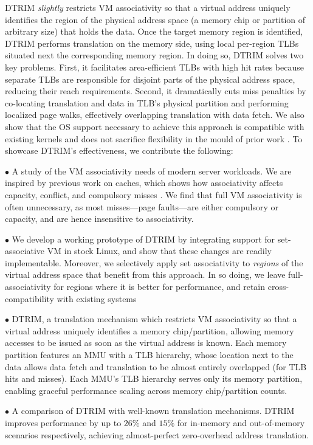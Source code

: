 DTRIM {\it slightly} restricts VM associativity so that a virtual
address uniquely identifies the region of the physical address space
(a memory chip or partition of arbitrary size) that holds the data. Once the target
memory region is identified, DTRIM performs translation on the memory
side, using local per-region TLBs situated next the corresponding
memory region. In doing so, DTRIM solves two key problems. First, it
facilitates area-efficient TLBs with high hit rates because separate
TLBs are responsible for disjoint parts of the physical address space,
reducing their reach requirements. Second, it dramatically cuts miss
penalties by co-locating translation and data in TLB's physical
partition and performing localized page walks, effectively overlapping 
translation with data fetch. We also show that
the OS support necessary to achieve this approach is compatible with
existing kernels and does not sacrifice flexibility in the mould of
prior work \cite{basu:efficient, haria:devirtualizing}. To showcase
DTRIM's effectiveness, we contribute the following:

\noindent $\bullet$ A study of the VM associativity needs of modern
server workloads. We are inspired by previous work on caches, which
shows how associativity affects capacity, conflict, and compulsory
misses \cite{hill:case}. We find that full VM associativity is often
unnecessary, as most misses---page faults---are either compulsory or
capacity, and are hence insensitive to associativity. 

\noindent $\bullet$ We develop a working prototype of DTRIM by
integrating support for set-associative VM in stock Linux, and show
that these changes are readily implementable. Moreover, we selectively
apply set associativity to {\it regions} of the virtual address space
that benefit from this approach. In so doing, we leave
full-associativity for regions where it is better for performance, and
retain cross-compatibility with existing systems 

\noindent $\bullet$ DTRIM, a translation mechanism which restricts VM
associativity so that a virtual address uniquely identifies a memory
chip/partition, allowing memory accesses to be issued as soon as the
virtual address is known. Each memory partition features an MMU with a
TLB hierarchy, whose location next to the data allows data fetch and
translation to be almost entirely overlapped (for TLB hits and
misses). Each MMU's TLB hierarchy serves only its memory partition,
enabling graceful performance scaling across memory chip/partition
counts.

\noindent $\bullet$ A comparison of DTRIM with well-known translation
mechanisms. DTRIM improves performance by up to $26\%$ and $15\%$ for
in-memory and out-of-memory scenarios respectively, achieving
almost-perfect zero-overhead address translation.
